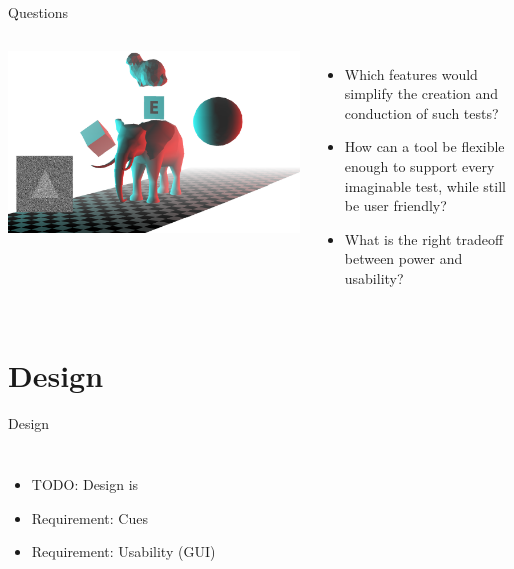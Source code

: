 \documentclass[12pt,ucs,hyperref={pdftext}]{beamer}
\newlength{\columnleft}
\newlength{\columnright}
\begin{document}
\begin{frame}{Questions}
\begin{columns}

\column{\columnleft}
\includegraphics[width=\columnleft]{media/title.png}

\column{\columnright}
\begin{itemize}%
\item Which features would simplify the creation and conduction of such tests?
\item How can a tool be flexible enough to support every imaginable test, while still be user friendly?
\item What is the right tradeoff between power and usability?
\end{itemize}

\end{columns}
\end{frame}


\section{Design}

\begin{frame}{Design}
\begin{columns}

\column{\columnleft}

\column{\columnright}
\begin{itemize}%
\item TODO: Design is
\item Requirement: Cues
\item Requirement: Usability (GUI)
\end{itemize}

\end{columns}
\end{frame}
\end{document}

